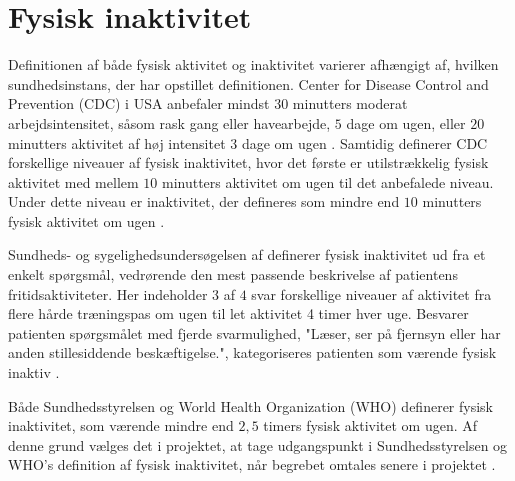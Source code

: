 \section{Fysisk inaktivitet}

Definitionen af både fysisk aktivitet og inaktivitet varierer afhængigt af, hvilken sundhedsinstans, der har opstillet definitionen. Center for Disease Control and Prevention (CDC) i USA anbefaler mindst $30$ minutters moderat arbejdsintensitet, såsom rask gang eller havearbejde, $5$ dage om ugen, eller $20$ minutters aktivitet af høj intensitet $3$ dage om ugen \citep{motionsraad2007,christensen2012}.
Samtidig definerer CDC forskellige niveauer af fysisk inaktivitet, hvor det første er utilstrækkelig fysisk aktivitet med mellem $10$ minutters aktivitet om ugen til det anbefalede niveau. Under dette niveau er inaktivitet, der defineres som mindre end $10$ minutters fysisk aktivitet om ugen \citep{motionsraad2007,christensen2012}.

Sundheds- og sygelighedsundersøgelsen af \citeauthor{christensen2012} definerer fysisk inaktivitet ud fra et enkelt spørgsmål, vedrørende den mest passende beskrivelse af patientens fritidsaktiviteter. Her indeholder $3$ af $4$ svar forskellige niveauer af aktivitet fra flere hårde træningspas om ugen til let aktivitet 4 timer hver uge. Besvarer patienten spørgsmålet med fjerde svarmulighed, "Læser, ser på fjernsyn eller har anden stillesiddende beskæftigelse.", kategoriseres patienten som værende fysisk inaktiv \citep{motionsraad2007,christensen2012}.

Både Sundhedsstyrelsen og World Health Organization (WHO) definerer fysisk inaktivitet, som værende mindre end $2,5$ timers fysisk aktivitet om ugen. Af denne grund vælges det i projektet, at tage udgangspunkt i Sundhedsstyrelsen og WHO's definition af fysisk inaktivitet, når begrebet omtales senere i projektet \citep{motionsraad2007}.